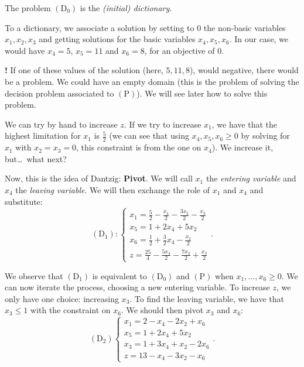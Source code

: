 \documentclass[./main]{subfiles}
\begin{document}
  The problem $(\mathrm{D}_0)$ is the \textit{(initial) dictionary}.

  To a dictionary, we associate a solution by setting to $0$ the non-basic variables $x_1, x_2, x_3$ and getting solutions for the basic variables $x_4, x_5, x_6$.
  In our case, we would have $x_4 = 5$, $x_5 = 11$ and $x_6 = 8$, for an objective of $0$.

  \textbf{\LARGE !}
  If one of these values of the solution (here, $5, 11, 8$), would negative, there would be a problem.
  We could have an empty domain (this is the problem of solving the decision problem associated to $(\mathrm{P})$).
  We will see later how to solve this problem.

  We can try by hand to increase $z$.
  If we try to increase $x_1$, we have that the highest limitation for $x_1$ is $\frac{5}{2}$ (we can see that using $x_4, x_5, x_6 \ge 0$ by solving for $x_1$ with $x_2 = x_3 = 0$, this constraint is from the one on $x_4$).
  We increase it, but\ldots\ what next?

  Now, this is the idea of Dantzig: \textbf{Pivot}.
  We will call $x_1$ the \textit{entering variable} and $x_4$ the \textit{leaving variable}.
  We will then exchange the role of $x_1$ and $x_4$ and substitute:
  \[
    (\mathrm{D}_1)
    :
    \begin{cases}
      x_1 = \frac{5}{2} - \frac{x_4}{2} - \frac{3 x_2}{2} - \frac{x_3}{2}\\
      x_5 = 1 + 2x_4+ 5x_2 \\
      x_6 = \frac{1}{2} + \frac{3}{2} x_4 - \frac{x_2}{2}\\
      z = \frac{25}{4} - \frac{5x_4}{2} - \frac{7x_2}{2} + \frac{x_3}{2}
    \end{cases}
  .\]

  We observe that $(\mathrm{D}_1)$ is equivalent to $(\mathrm{D}_0)$ and $(\mathrm{P})$ when $x_1, \ldots, x_6 \ge 0$.
  We can now iterate the process, choosing a new entering variable.
  To increase $z$, we only have one choice: increasing $x_3$.
  To find the leaving variable, we have that $x_3 \le 1$ with the constraint on $x_6$.
  We should then pivot $x_3$ and $x_6$:
  \[
    (\mathrm{D}_2)
    \begin{cases}
    x_1 = 2 - x_4 - 2x_2 + x_6\\
    x_5 = 1 + 2x_4 + 5x_2 \\
    x_3 = 1 + 3x_4 + x_2 - 2x_6\\
    z = 13 - x_4 - 3x_2 - x_6
  \end{cases}
  .\]
\end{document}

